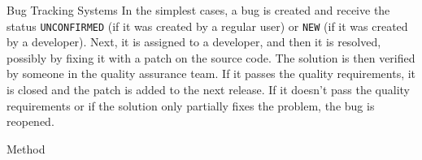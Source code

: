 \begin{subsection}{Bug Tracking Systems}
In the simplest cases, a bug is created and receive the status \texttt{UNCONFIRMED} (if it was created by a regular user) or \texttt{NEW} (if it was created by a developer). Next, it is assigned to a developer, and then it is resolved, possibly by fixing it with a patch on the source code. The solution is then verified by someone in the quality assurance team. If it passes the quality requirements, it is closed and the patch is added to the next release. If it doesn’t pass the quality requirements or if the solution only partially fixes the problem, the bug is reopened.


\end{subsection}

\begin{section}{Method}
	
\end{section}

